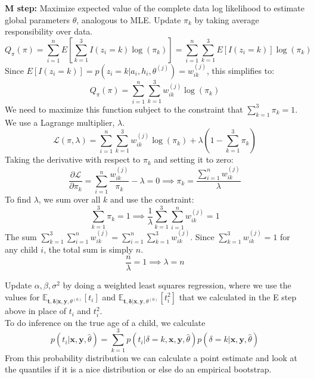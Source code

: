 \documentclass{article}
\begin{document}
\begin{itemize}
\begin{enumerate}[label=(\alph*)]
      \textbf{M step:} Maximize expected value of the complete data log likelihood to estimate global parameters $\theta$, analogous to MLE.
      Update $\pi_k$ by taking average responsibility over data.
      $$Q_{\pi}(\pi) = \sum_{i=1}^n E \left[ \sum_{k=1}^3 I(z_i=k) \log(\pi_k) \right] = \sum_{i=1}^n \sum_{k=1}^3 E[I(z_i=k)] \log(\pi_k)$$Since $E[I(z_i=k)] = p(z_i=k | a_i, h_i, \theta^{(j)}) = w_{ik}^{(j)}$, this simplifies to:$$Q_{\pi}(\pi) = \sum_{i=1}^n \sum_{k=1}^3 w_{ik}^{(j)} \log(\pi_k)$$We need to maximize this function subject to the constraint that $\sum_{k=1}^3 \pi_k = 1$. We use a Lagrange multiplier, $\lambda$.$$\mathcal{L}(\pi, \lambda) = \sum_{i=1}^n \sum_{k=1}^3 w_{ik}^{(j)} \log(\pi_k) + \lambda(1 - \sum_{k=1}^3 \pi_k)$$Taking the derivative with respect to $\pi_k$ and setting it to zero:$$\frac{\partial \mathcal{L}}{\partial \pi_k} = \sum_{i=1}^n \frac{w_{ik}^{(j)}}{\pi_k} - \lambda = 0 \implies \pi_k = \frac{\sum_{i=1}^n w_{ik}^{(j)}}{\lambda}$$To find $\lambda$, we sum over all $k$ and use the constraint:$$\sum_{k=1}^3 \pi_k = 1 \implies \frac{1}{\lambda} \sum_{k=1}^3 \sum_{i=1}^n w_{ik}^{(j)} = 1$$The sum $\sum_{k=1}^3 \sum_{i=1}^n w_{ik}^{(j)} = \sum_{i=1}^n \sum_{k=1}^3 w_{ik}^{(j)}$. Since $\sum_{k=1}^3 w_{ik}^{(j)} = 1$ for any child $i$, the total sum is simply $n$.$$\frac{n}{\lambda} = 1 \implies \lambda = n$$

      Update $\alpha, \beta, \sigma^2$ by doing a weighted least squares regression, where we use the values for $\mathbb{E}_{\mathbf{t}, \mathbf{\delta} | \mathbf{x}, \mathbf{y}, \theta^{(0)}}[t_i]$ and
      $\mathbb{E}_{\mathbf{t}, \mathbf{\delta} | \mathbf{x}, \mathbf{y}, \theta^{(0)}}[t_i^2]$ that we calculated in the E step above in place of $t_i$ and $t_i^2$. \\

      To do inference on the true age of a child, we calculate
      \[p(t_i| \mathbf{x}, \mathbf{y}, \hat{\theta}) = \sum_{k=1}^{3} p(t_i| \delta=k, \mathbf{x}, \mathbf{y}, \hat{\theta}) p(\delta=k| \mathbf{x}, \mathbf{y}, \hat{\theta})  \]
      From this probability distribution we can calculate a point estimate and look at the quantiles if it is a nice distribution or else do an empirical bootstrap.


\end{enumerate}
\end{itemize}
\end{document}
